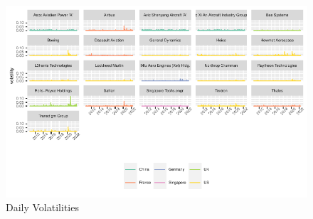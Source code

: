 \documentclass[
  number]{elsarticle}
\begin{document}
\begin{figure}[H]

{\centering \includegraphics{defence_files/figure-pdf/fig-vols-1.pdf}

}

\caption{\label{fig-vols}Daily Volatilities}

\end{figure}
\end{document}
